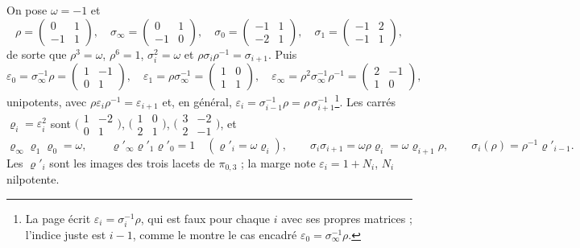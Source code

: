 \documentclass[11pt,a4paper]{article}
\begin{document}
On pose $\omega = -1$ et
\[
\rho = \begin{pmatrix} 0 & 1 \\ -1 & 1 \end{pmatrix}, \quad
\sigma_\infty = \begin{pmatrix} 0 & 1 \\ -1 & 0 \end{pmatrix}, \quad
\sigma_0 = \begin{pmatrix} -1 & 1 \\ -2 & 1 \end{pmatrix}, \quad
\sigma_1 = \begin{pmatrix} -1 & 2 \\ -1 & 1 \end{pmatrix},
\]
de sorte que $\rho^3 = \omega$, $\rho^6 = 1$, $\sigma_i^2 = \omega$ et
$\rho\sigma_i\rho^{-1} = \sigma_{i+1}$. Puis
\[
\varepsilon_0 = \sigma_\infty^{-1}\rho = \begin{pmatrix} 1 & -1 \\ 0 & 1 \end{pmatrix}, \quad
\varepsilon_1 = \rho\sigma_\infty^{-1} = \begin{pmatrix} 1 & 0 \\ 1 & 1 \end{pmatrix}, \quad
\varepsilon_\infty = \rho^2\sigma_\infty^{-1}\rho^{-1} = \begin{pmatrix} 2 & -1 \\ 1 & 0 \end{pmatrix},
\]
unipotents, avec $\rho\varepsilon_i\rho^{-1} = \varepsilon_{i+1}$ et, en
général, $\varepsilon_i = \sigma_{i-1}^{-1}\rho = \rho\,\sigma_{i+1}^{-1}$\footnote{La
page écrit $\varepsilon_i = \sigma_i^{-1}\rho$, qui est faux pour chaque $i$
avec ses propres matrices ; l'indice juste est $i - 1$, comme le montre le cas
encadré $\varepsilon_0 = \sigma_\infty^{-1}\rho$.}. Les carrés
$\varrho_i = \varepsilon_i^2$ sont
$\bigl(\begin{smallmatrix} 1 & -2 \\ 0 & 1 \end{smallmatrix}\bigr)$,
$\bigl(\begin{smallmatrix} 1 & 0 \\ 2 & 1 \end{smallmatrix}\bigr)$,
$\bigl(\begin{smallmatrix} 3 & -2 \\ 2 & -1 \end{smallmatrix}\bigr)$, et
\[
\varrho_\infty\varrho_1\varrho_0 = \omega, \qquad
\varrho'_\infty\varrho'_1\varrho'_0 = 1 \quad (\varrho'_i = \omega\varrho_i), \qquad
\sigma_i\sigma_{i+1} = \omega\rho\varrho_i = \omega\varrho_{i+1}\rho, \qquad
\sigma_i(\rho) = \rho^{-1}\varrho'_{i-1} .
\]
Les $\varrho'_i$ sont les images des trois lacets de $\pi_{0,3}$ ; la marge
note $\varepsilon_i = 1 + N_i$, $N_i$ nilpotente.
\end{document}

